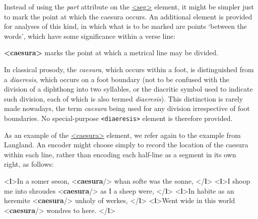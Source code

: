 Instead of using the {\itshape part} attribute on the \hyperref[TEI.seg]{<seg>} element, it might be simpler just to mark the point at which the caesura occurs. An additional element is provided for analyses of this kind, in which what is to be marked are points ‘between the words’, which have some significance within a verse line: 
\begin{sansreflist}
  
\item [\textbf{<caesura>}] marks the point at which a metrical line may be divided.
\end{sansreflist}
 In classical prosody, the \textit{caesura}, which occurs within a foot, is distinguished from a \textit{diaeresis}, which occurs on a foot boundary (not to be confused with the division of a diphthong into two syllables, or the diacritic symbol used to indicate such division, each of which is also termed \textit{diaeresis}). This distinction is rarely made nowadays, the term \textit{caesura} being used for any division irrespective of foot boundaries. No special-purpose \texttt{<diaeresis>} element is therefore provided.\par
As an example of the \hyperref[TEI.caesura]{<caesura>} element, we refer again to the example from Langland. An encoder might choose simply to record the location of the caesura within each line, rather than encoding each half-line as a segment in its own right, as follows: \par\bgroup{}\exampleFont \begin{shaded}\noindent\mbox{}{<\textbf{l}>}In a somer seson,\mbox{}\newline 
{<\textbf{caesura}/>} whan softe was the sonne, {</\textbf{l}>}\mbox{}\newline 
{<\textbf{l}>}I shoop me into shroudes {<\textbf{caesura}/>} as I a sheep were, {</\textbf{l}>}\mbox{}\newline 
{<\textbf{l}>}In habite as an heremite {<\textbf{caesura}/>} unholy of werkes, {</\textbf{l}>}\mbox{}\newline 
{<\textbf{l}>}Went wide in this world {<\textbf{caesura}/>} wondres to here. {</\textbf{l}>}\end{shaded}\egroup\par \noindent  \par
